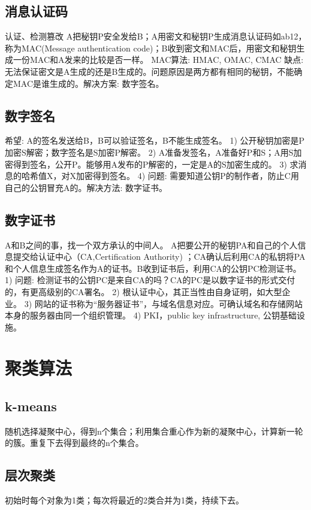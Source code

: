 \documentclass[UTF8]{../computerUniverse}
\begin{document}
\subsection{消息认证码}
认证、检测篡改
A把秘钥P安全发给B；A用密文和秘钥P生成消息认证码如ab12，称为MAC(Message authentication code)；B收到密文和MAC后，用密文和秘钥生成一份MAC和A发来的比较是否一样。
MAC算法: HMAC, OMAC, CMAC
缺点: 无法保证密文是A生成的还是B生成的。问题原因是两方都有相同的秘钥，不能确定MAC是谁生成的。解决方案: 数字签名。


\subsection{数字签名}
希望: A的签名发送给B，B可以验证签名，B不能生成签名。
1) 公开秘钥加密是P加密S解密；数字签名是S加密P解密。
2) A准备发签名，A准备好P和S；A用S加密得到签名，公开P。能够用A发布的P解密的，一定是A的S加密生成的。
3) 求消息的哈希值X，对X加密得到签名。
4) 问题: 需要知道公钥P的制作者，防止C用自己的公钥冒充A的。解决方法: 数字证书。


\subsection{数字证书}
A和B之间的事，找一个双方承认的中间人。
A把要公开的秘钥PA和自己的个人信息提交给认证中心（CA,Certification Authority) ；CA确认后利用CA的私钥将PA和个人信息生成签名作为A的证书。B收到证书后，利用CA的公钥PC检测证书。
1) 问题: 检测证书的公钥PC是来自CA的吗？CA的PC是以数字证书的形式交付的，有更高级别的CA署名。
2) 根认证中心，其正当性由自身证明，如大型企业。
3) 网站的证书称为“服务器证书”，与域名信息对应。可确认域名和存储网站本身的服务器由同一个组织管理。
4) PKI，public key infrastructure, 公钥基础设施。



\section{聚类算法}

\subsection{k-means}
随机选择凝聚中心，得到n个集合；利用集合重心作为新的凝聚中心，计算新一轮的簇。重复下去得到最终的n个集合。

\subsection{层次聚类}
初始时每个对象为1类；每次将最近的2类合并为1类，持续下去。
\end{document}
